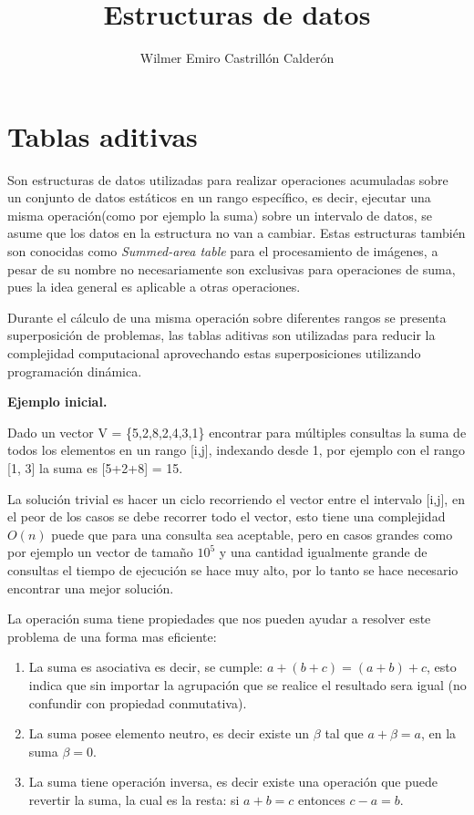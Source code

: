 \documentclass[12pt, a4paper]{article}
\title{\textbf{Estructuras de datos}}
\author{Wilmer Emiro Castrillón Calderón}
\newcommand{\subtitulo}[1]{\begin{center}\textbf{#1}\end{center}}
\begin{document}
	\maketitle
	
	
	\section{Tablas aditivas}
	Son estructuras de datos utilizadas para realizar operaciones acumuladas sobre un conjunto de datos estáticos 
	en un rango específico, es decir, ejecutar una misma operación(como por ejemplo la suma) sobre un intervalo 
	de datos, se asume que los datos en la estructura no van a cambiar. Estas estructuras también son conocidas como 
	\textit{Summed-area table} para el procesamiento de imágenes, a pesar de su nombre no necesariamente son 
	exclusivas para operaciones de suma, pues la idea general es aplicable a otras operaciones.
	
	Durante el cálculo de una misma operación sobre diferentes rangos se presenta superposición de problemas, las 
	tablas aditivas son utilizadas para reducir la complejidad computacional aprovechando estas superposiciones
	utilizando programación dinámica.
	
	\subtitulo{Ejemplo inicial.}
	
	Dado un vector V = \{5,2,8,2,4,3,1\} encontrar para múltiples consultas la suma de todos los elementos en un rango
	[i,j], indexando desde 1, por ejemplo con el rango [1, 3] la suma es [5+2+8] = 15.
	
	La solución trivial es hacer un ciclo recorriendo el vector entre el intervalo [i,j], en el peor de los casos se
	debe recorrer todo el vector, esto tiene una complejidad $O(n)$ puede que para una consulta sea aceptable, pero
	en casos grandes como por ejemplo un vector de tamaño $10^{5}$ y una cantidad igualmente grande de consultas el
	tiempo de ejecución se hace muy alto, por lo tanto se hace necesario encontrar una mejor solución.	
	
	La operación suma tiene propiedades que nos pueden ayudar a resolver este problema de una forma mas eficiente:
	\begin{enumerate}[1.]
		\item La suma es asociativa es decir, se cumple: $a+(b+c)=(a+b)+c$, esto indica que sin importar 
			la agrupación que se realice el resultado sera igual (no confundir con propiedad conmutativa).
		\item La suma posee elemento neutro, es decir existe un $\beta$ tal que $a + \beta = a$, en la suma 
			$\beta = 0$.
		\item La suma tiene operación inversa, es decir existe una operación que puede revertir la suma, la cual 
			es la resta: si $a+b=c$ entonces $c-a=b$.
	\end{enumerate}
	
\end{document}
